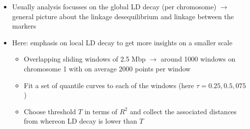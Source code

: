 \documentclass[a0paper,portrait]{baposter}
\begin{document}
\begin{poster}
{\begin{itemize}[leftmargin=*]
\item Usually analysis focusses on the global LD decay (per chromosome) $\rightarrow$ general picture about the 
	linkage desequilibrium and linkage between the markers
\item Here: emphasis on local LD decay to get more insights on a smaller scale
	\begin{itemize}[leftmargin=*]
	\item Overlapping sliding windows of 2.5 Mbp $\rightarrow$ around 1000 windows on chromosome 1 with on average 
			2000 points per window
	\item Fit a set of quantile curves to each of the windows (here $\tau=0.25, 0.5, 075$)
	\item Choose threshold $T$ in terms of $R^2$ and collect the associated distances from whereon LD decay is 	
		lower than $T$
	\end{itemize}
%
\end{itemize}
}








\end{poster}
\end{document}
